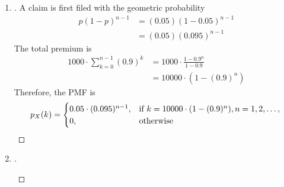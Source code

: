 \documentclass[paper=usletter, fontsize=12pt]{article}
\begin{document}
\begin{enumerate}
        \item
        \begin{proof}[\unskip\nopunct]
            A claim is first filed with the geometric probability
            \begin{align*}
                p(1-p)^{n-1} & = (0.05)(1 - 0.05)^{n-1}\\
                & =(0.05)(0.095)^{n-1}
            \end{align*}
            The total premium is
            \begin{align*}
                1000 \cdot \sum_{k=0}^{n-1} (0.9)^k & = 1000 \cdot \frac{1-0.9^n}{1-0.9}\\
                & = 10000 \cdot (1-(0.9)^n)
            \end{align*}
            Therefore, the PMF is
            \begin{equation*}
                p_X(k) =
                \begin{cases}
                    0.05 \cdot (0.095)^{n-1}, & \text{if}\ k = 10000 \cdot (1-(0.9)^n), n = 1,2, \ldots,\\
                    0, & \text{otherwise}
                \end{cases} \qedhere
            \end{equation*}
        \end{proof}
        \vspace{0.2in}

        \item
        \begin{proof}[\unskip\nopunct]

            \begin{enumerate}


\end{enumerate}
\end{proof}
\end{enumerate}
\end{document}
